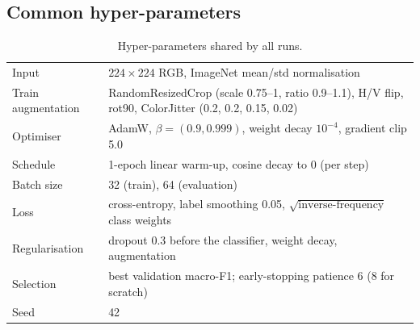 \subsection{Common hyper-parameters}
\begin{table}[H]
\centering
\caption{Hyper-parameters shared by all runs.}
\label{tab:hparams}
\begin{tabularx}{\textwidth}{lX}
\toprule
Input & $224\times224$ RGB, ImageNet mean/std normalisation \\
Train augmentation & RandomResizedCrop (scale 0.75--1, ratio 0.9--1.1), H/V flip, rot90, ColorJitter (0.2, 0.2, 0.15, 0.02) \\
Optimiser & AdamW, $\beta=(0.9,0.999)$, weight decay $10^{-4}$, gradient clip 5.0 \\
Schedule & 1-epoch linear warm-up, cosine decay to 0 (per step) \\
Batch size & 32 (train), 64 (evaluation) \\
Loss & cross-entropy, label smoothing 0.05, $\sqrt{\text{inverse-frequency}}$ class weights \\
Regularisation & dropout 0.3 before the classifier, weight decay, augmentation \\
Selection & best validation macro-F1; early-stopping patience 6 (8 for scratch) \\
Seed & 42 \\
\bottomrule
\end{tabularx}
\end{table}
